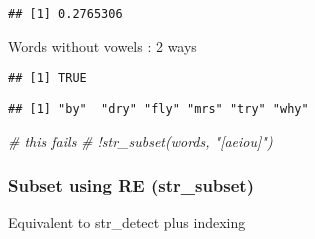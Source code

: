 \documentclass[
]{article}
\newenvironment{Shaded}{\begin{snugshade}}{\end{snugshade}}
\newcommand{\CommentTok}[1]{\textcolor[rgb]{0.56,0.35,0.01}{\textit{#1}}}
\newcommand{\DecValTok}[1]{\textcolor[rgb]{0.00,0.00,0.81}{#1}}
\newcommand{\KeywordTok}[1]{\textcolor[rgb]{0.13,0.29,0.53}{\textbf{#1}}}
\newcommand{\NormalTok}[1]{#1}
\newcommand{\OperatorTok}[1]{\textcolor[rgb]{0.81,0.36,0.00}{\textbf{#1}}}
\newcommand{\StringTok}[1]{\textcolor[rgb]{0.31,0.60,0.02}{#1}}
\begin{document}
\begin{verbatim}
## [1] 0.2765306
\end{verbatim}

Words without vowels : 2 ways

\begin{Shaded}
\end{Shaded}

\begin{verbatim}
## [1] TRUE
\end{verbatim}

\begin{Shaded}
\end{Shaded}

\begin{verbatim}
## [1] "by"  "dry" "fly" "mrs" "try" "why"
\end{verbatim}

\begin{Shaded}
\begin{Highlighting}[]
\CommentTok{\# this fails}
\CommentTok{\# !str\_subset(words, "[aeiou]")}
\end{Highlighting}
\end{Shaded}

\hypertarget{subset-using-re-str_subset}{%
\subsubsection{Subset using RE
(str\_subset)}\label{subset-using-re-str_subset}}

Equivalent to str\_detect plus indexing

\begin{Shaded}
\end{Shaded}
\end{document}
